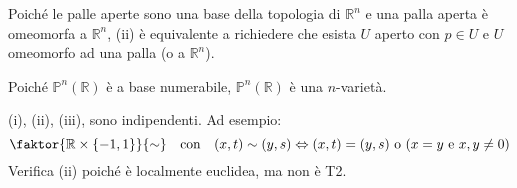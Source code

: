 \begin{oss}
Poiché le palle aperte sono una base della topologia di $\mathbb{R}^n$ e una palla aperta è omeomorfa a $\mathbb{R}^n$, (ii) è equivalente a richiedere che esista $U$ aperto con $p \in U$ e $U$ omeomorfo ad una palla (o a $\mathbb{R}^n$).
\end{oss}

\begin{oss}
Poiché $\mathbb{P}^n(\mathbb{R})$ è a base numerabile, $\mathbb{P}^n(\mathbb{R})$ è una $n$-varietà.
\end{oss}

\begin{oss}
(i), (ii), (iii), sono indipendenti. Ad esempio:
$$\faktor{\mathbb{R} \times \{-1,1\}}{\sim} \quad \text{con} \quad (x,t) \sim (y,s) \Leftrightarrow (x,t)=(y,s) \text{ o } (x=y \text{ e }x,y \neq 0)$$
Verifica (ii) poiché è localmente euclidea, ma non è T2.
\end{oss}
